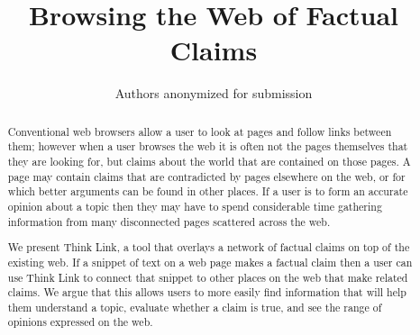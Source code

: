 \documentclass{chi2009}
\begin{document}
\setlength{\paperheight}{11in}
\setlength{\paperwidth}{8.5in}
\setlength{\pdfpageheight}{\paperheight}
\setlength{\pdfpagewidth}{\paperwidth}
%

\title{Browsing the Web of Factual Claims}


\author{
	\alignauthor Authors anonymized for submission
}


\sloppy 

\maketitle

\begin{abstract}

Conventional web browsers allow a user to look at pages and follow links between them; however when a user browses the web it is often not the pages themselves that they are looking for, but claims about the world that are contained on those pages. A page may contain claims that are contradicted by pages elsewhere on the web, or for which better arguments can be found in other places. If a user is to form an accurate opinion about a topic then they may have to spend considerable time gathering information from many disconnected pages scattered across the web.

We present Think Link, a tool that overlays a network of factual claims on top of the existing web. If a snippet of text on a web page makes a factual claim then a user can use Think Link to connect that snippet to other places on the web that make related claims. We argue that this allows users to more easily find information that will help them understand a topic, evaluate whether a claim is true, and see the range of opinions expressed on the web.

\end{abstract}
\end{document}
